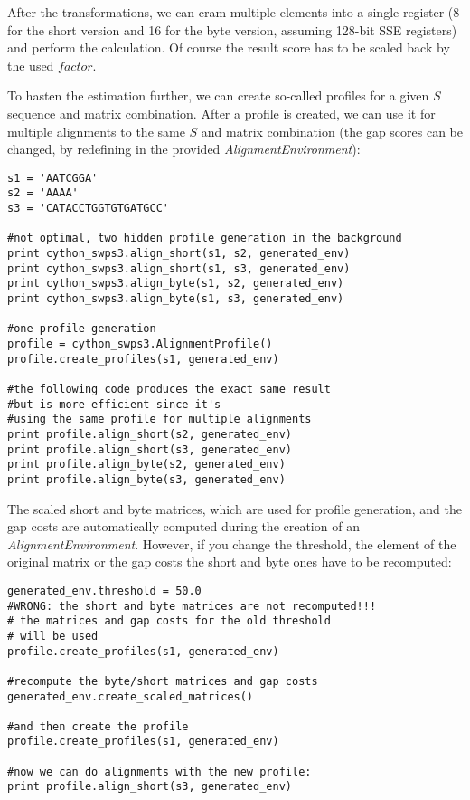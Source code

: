 \documentclass[12pt]{article}
\newcommand{\alenv}{\emph{AlignmentEnvironment}}
\begin{document}
After the transformations, we can cram multiple elements into a single register (8 for the short version and 16 for the byte version, assuming 128-bit SSE registers) and perform the calculation. Of course the result score has to be scaled back by the used $factor$.

To hasten the estimation further, we can create so-called profiles for a given $S$ sequence and matrix combination. After a profile is created, we can use it for multiple alignments to the same $S$ and matrix combination (the gap scores can be changed, by redefining in the provided \alenv{}):

\begin{lstlisting}
s1 = 'AATCGGA'
s2 = 'AAAA'
s3 = 'CATACCTGGTGTGATGCC'

#not optimal, two hidden profile generation in the background
print cython_swps3.align_short(s1, s2, generated_env)
print cython_swps3.align_short(s1, s3, generated_env)
print cython_swps3.align_byte(s1, s2, generated_env)
print cython_swps3.align_byte(s1, s3, generated_env)

#one profile generation
profile = cython_swps3.AlignmentProfile()
profile.create_profiles(s1, generated_env)

#the following code produces the exact same result
#but is more efficient since it's
#using the same profile for multiple alignments
print profile.align_short(s2, generated_env)
print profile.align_short(s3, generated_env)
print profile.align_byte(s2, generated_env)
print profile.align_byte(s3, generated_env)
\end{lstlisting}

The scaled short and byte matrices, which are used for profile generation, and the gap costs are automatically computed during the creation of an \alenv{}. However, if you change the threshold, the element of the original matrix or the gap costs the short and byte ones have to be recomputed:
\begin{lstlisting}
generated_env.threshold = 50.0
#WRONG: the short and byte matrices are not recomputed!!!
# the matrices and gap costs for the old threshold
# will be used
profile.create_profiles(s1, generated_env)

#recompute the byte/short matrices and gap costs
generated_env.create_scaled_matrices()

#and then create the profile
profile.create_profiles(s1, generated_env)

#now we can do alignments with the new profile:
print profile.align_short(s3, generated_env)
\end{lstlisting}
\end{document}
